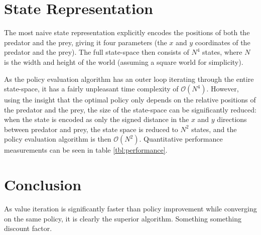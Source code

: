 \documentclass[a4paper, 12pt]{article}
\begin{document}
\section*{State Representation}
The most naive state representation explicitly encodes the positions of both the
predator and the prey, giving it four parameters (the $x$ and $y$ coordinates of
the predator and the prey). The full state-space then consists of $N^4$ states,
where $N$ is the width and height of the world (assuming a square world for
simplicity).

As the policy evaluation algorithm has an outer loop iterating through the
entire state-space, it has a fairly unpleasant time complexity of
$\mathcal{O}(N^4)$. However, using the insight that the optimal policy only
depends on the relative positions of the predator and the prey, the size of the
state-space can be significantly reduced: when the state is encoded as only the
signed distance in the $x$ and $y$ directions between predator and prey, the
state space is reduced to $N^2$ states, and the policy evaluation algorithm is
then $\mathcal{O}(N^2)$. Quantitative performance measurements can be seen in table
\ref{tbl:performance}.

\section*{Conclusion}
As value iteration is significantly faster than policy improvement while
converging on the same policy, it is clearly the superior algorithm.
Something something discount factor.
\end{document}
